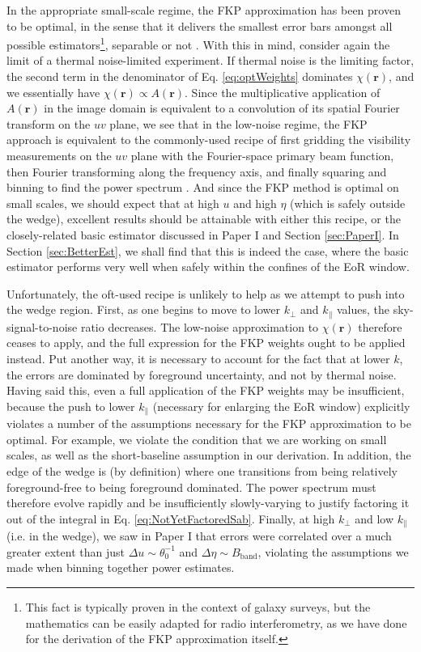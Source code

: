 \documentclass[twocolumn,aps,prd,nofootinbib,showpacs]{revtex4-1}
\begin{document}
In the appropriate small-scale regime, the FKP approximation has been proven to be optimal, in the sense that it delivers the smallest error bars amongst all possible estimators\footnote{This fact is typically proven in the context of galaxy surveys, but the mathematics can be easily adapted for radio interferometry, as we have done for the derivation of the FKP approximation itself.}, separable or not \cite{Tegmark1998}.  With this in mind, consider again the limit of a thermal noise-limited experiment.   If thermal noise is the limiting factor, the second term in the denominator of Eq. \eqref{eq:optWeights} dominates $\chi(\mathbf{r})$, and we essentially have $\chi(\mathbf{r}) \propto A(\mathbf{r})$.  Since the multiplicative application of $A (\mathbf{r})$ in the image domain is equivalent to a convolution of its spatial Fourier transform on the $uv$ plane, we see that in the low-noise regime, the FKP approach is equivalent to the commonly-used recipe of first gridding the visibility measurements on the $uv$ plane with the Fourier-space primary beam function, then Fourier transforming along the frequency axis, and finally squaring and binning to find the power spectrum \cite{Bernardi2013,Thyagarajan2013,Hazelton2013}.  And since the FKP method is optimal on small scales, we should expect that at high $u$ and high $\eta$ (which is safely outside the wedge), excellent results should be attainable with either this recipe, or the closely-related basic estimator discussed in Paper I and Section \ref{sec:PaperI}.  In Section \ref{sec:BetterEst}, we shall find that this is indeed the case, where the basic estimator performs very well when safely within the confines of the EoR window.

Unfortunately, the oft-used recipe is unlikely to help as we attempt to push into the wedge region.  First, as one begins to move to lower $k_\perp$ and $k_\parallel$ values, the sky-signal-to-noise ratio decreases.  The low-noise approximation to $\chi(\mathbf{r})$ therefore ceases to apply, and the full expression for the FKP weights ought to be applied instead.  Put another way, it is necessary to account for the fact that at lower $k$, the errors are dominated by foreground uncertainty, and not by thermal noise.  Having said this, even a full application of the FKP weights may be insufficient, because the push to lower $k_\parallel$ (necessary for enlarging the EoR window) explicitly violates a number of the assumptions necessary for the FKP approximation to be optimal.  For example, we violate the condition that we are working on small scales, as well as the short-baseline assumption in our derivation.  In addition, the edge of the wedge is (by definition) where one transitions from being relatively foreground-free to being foreground dominated.  The power spectrum must therefore evolve rapidly and be insufficiently slowly-varying to justify factoring it out of the integral in Eq. \ref{eq:NotYetFactoredSab}.  Finally, at high $k_\perp$ and low $k_\parallel$ (i.e. in the wedge), we saw in Paper I that errors were correlated over a much greater extent than just $\Delta u \sim \theta_0^{-1}$ and $\Delta \eta \sim B_\textrm{band}$, violating the assumptions we made when binning together power estimates.
\end{document}
